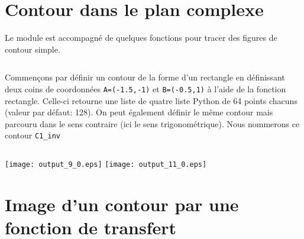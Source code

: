 \section{Contour dans le plan complexe\label{contour-dans-le-plan-complexe}}
Le module est accompagné de quelques fonctions pour tracer des figures
de contour simple.
\begin{tcolorbox}[breakable, size=fbox, boxrule=1pt, pad at break*=1mm,colback=cellbackground, colframe=cellborder]
\inputminted{python}{codes/python/annexe_cauchy_cellule4.py}
\end{tcolorbox}

Commençons par définir un contour de la forme d'un rectangle en
définissant deux coins de coordonnées \texttt{A=(-1.5,-1)} et
\texttt{B=(-0.5,1)} à l'aide de la fonction rectangle. Celle-ci retourne
une liste de quatre liste Python de 64 points chacuns (valeur par
défaut: 128).
On peut également définir le même contour mais parcouru dans le sens
contraire (ici le sens trigonométrique). Nous nommerons ce contour
\texttt{C1\_inv}

    \begin{tcolorbox}[breakable, size=fbox, boxrule=1pt, pad at break*=1mm,colback=cellbackground, colframe=cellborder]
\inputminted{python}{codes/python/annexe_cauchy_cellule5.py}
\end{tcolorbox}
\begin{center}
    \texttt{[image: output\_9\_0.eps]}
    \texttt{[image: output\_11\_0.eps]}
\end{center}
\section{Image d'un contour par une fonction de transfert
\label{image-dun-contour-par-une-fonction-de-transfert}}
